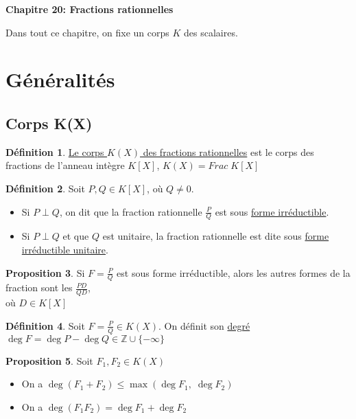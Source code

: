 \documentclass[10pt,a4paper]{article}
\theoremstyle{definition}
\newtheorem{proposition}{Proposition}[section]
\newtheorem{definition}[proposition]{Définition}
\begin{document}
\renewcommand{\labelitemi}{$*$}
\begin{center}
{\Large \textbf{Chapitre 20: Fractions rationnelles}}
\end{center}
Dans tout ce chapitre, on fixe un corps $K$ des scalaires.

\section{Généralités}
\subsection{Corps K(X)}
\begin{definition}
\uline{Le corps $K(X)$ des fractions rationnelles} est le corps des fractions de l'anneau intègre $K[X]$, $K(X) = Frac \; K[X]$
\end{definition}
\begin{definition}
Soit $P, Q \in K[X]$, où $Q \neq 0$.
\begin{itemize}
\item Si $P \perp Q$, on dit que la fraction rationnelle $\frac{P}{Q}$ est sous \uline{forme irréductible}.
\item Si $P \perp Q$ et que $Q$ est unitaire, la fraction rationnelle est dite sous \uline{forme irréductible unitaire}.
\end{itemize}
\end{definition}
\begin{proposition}
Si $F = \frac{P}{Q}$ est sous forme irréductible, alors les autres formes de la fraction sont les $\frac{PD}{QD}$, \\
où $D \in K[X]$
\end{proposition}
\begin{definition}
Soit $F = \frac{P}{Q} \in K(X)$. On définit son \uline{degré} $\deg{F} = \deg{P} - \deg{Q} \in \mathbb{Z} \cup \{-\infty\}$
\end{definition}
\begin{proposition}
Soit $F_1, F_2 \in K(X)$
\begin{itemize}
\item On a $\deg{(F_1 + F_2)} \leq \max{(\deg{F_1},\; \deg{F_2})}$
\item On a $\deg{(F_1 F_2)} = \deg{F_1} + \deg{F_2}$
\end{itemize}
\end{proposition}
\end{document}

